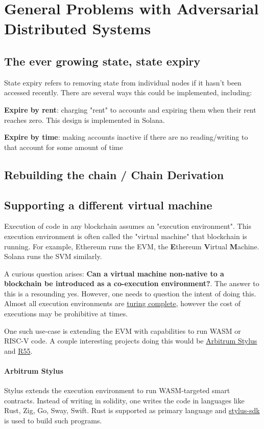 \chapter{General Problems with Adversarial Distributed Systems}
\section{The ever growing state, state expiry}
State expiry refers to removing state from individual nodes if it hasn't been accessed recently. There are several ways this could be implemented, including:

\textbf{Expire by rent}: charging "rent" to accounts and expiring them when their rent reaches zero. This design is implemented in Solana.

\textbf{Expire by time}: making accounts inactive if there are no reading/writing to that account for some amount of time


\section{Rebuilding the chain / Chain Derivation}

\section{Supporting a different virtual machine}
Execution of code in any blockchain assumes an "execution environment". This execution environment is often called the "virtual machine" that blockchain is running. For example, Ethereum runs the EVM, the \textbf{E}thereum \textbf{V}irtual \textbf{M}achine. Solana runs the SVM similarly.

A curious question arises: \textbf{Can a virtual machine non-native to a blockchain be introduced as a co-execution environment?}. The answer to this is a resounding yes. However, one needs to question the intent of doing this. Almost all execution environments are \href{https://www.bitstamp.net/learn/blockchain/what-is-turing-complete/}{turing complete}, however the cost of executions may be prohibitive at times.

One such use-case is extending the EVM with capabilities to run WASM or RISC-V code. A couple interesting projects doing this would be \href{https://arbitrum.io/stylus}{Arbitrum Stylus} and \href{https://hackmd.io/@leoalt/r55}{R55}.

\subsubsection{Arbitrum Stylus}
Stylus extends the execution environment to run WASM-targeted smart contracts. Instead of writing in solidity, one writes the code in languages like Rust, Zig, Go, Sway, Swift. Rust is supported as primary language and \href{https://docs.arbitrum.io/stylus/reference/overview}{stylus-sdk} is used to build such programs.

